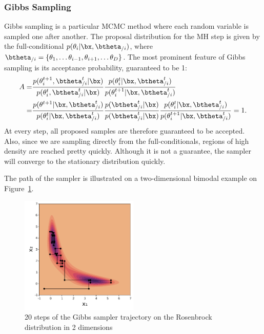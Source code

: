 \subsubsection{Gibbs Sampling}

Gibbs sampling is a particular \ac{MCMC} method where each random variable is sampled one after another.
The proposal distribution for the \ac{MH} step is given by the full-conditional  $p(\theta_i|\bx,\btheta_{/i})$, where $\btheta_{/i}=\{\theta_1, \ldots \theta_{i-1}, \theta_{i+1},\ldots \theta_{D}\}$.
The most prominent feature of Gibbs sampling is its acceptance probability, guaranteed to be 1:
\begin{align*}
    A =& \frac{p(\theta^{t+1}_i,\btheta^t_{/i}|\bx)}{p(\theta^t_i,\btheta^t_{/i}|\bx)}\frac{p(\theta^t_i|\bx,\btheta^{t}_{/i})}{p(\theta^{t+1}_i|\bx,\btheta^t_{/i})}\\
    =& \frac{p(\theta^{t+1}|\bx, \btheta^{t}_{/i})}{p(\theta^t_i|\bx,\btheta^t_{/i})}\frac{p(\btheta^t_{/i}|\bx)}{p(\btheta^t_{/i}|\bx)}\frac{p(\theta^t_i|\bx,\btheta^{t}_{/i})}{p(\theta^{t+1}_i|\bx,\btheta^t_{/i})} = 1.
\end{align*}
At every step, all proposed samples are therefore guaranteed to be accepted.
Also, since we are sampling directly from the full-conditionals, regions of high density are reached pretty quickly.
Although it is not a guarantee, the sampler will converge to the stationary distribution quickly.

The path of the sampler is illustrated on a two-dimensional bimodal example on Figure~\ref{fig:gibbs_samp}.

\begin{figure}
\centering
\includegraphics[width=0.5\textwidth]{./chapters/2_background/figures/gibbs_sampling.pdf}
\caption{20 steps of the Gibbs sampler trajectory on the Rosenbrock distribution in 2 dimensions}
\label{fig:gibbs_samp}
\end{figure}

